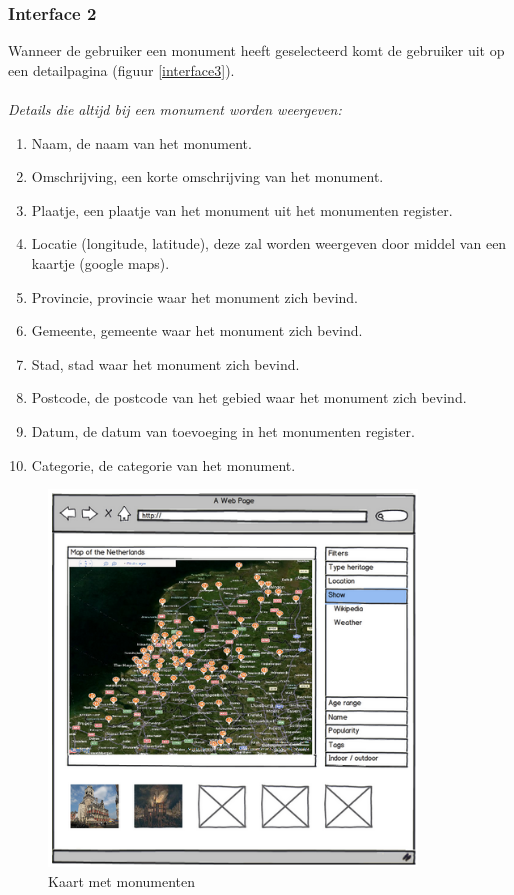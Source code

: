 \documentclass[a4paper,10pt]{article}
\begin{document}
			\subsubsection{Interface 2}
			Wanneer de gebruiker een monument heeft geselecteerd komt de gebruiker uit op een detailpagina (figuur \ref{interface3}).\\
			\\
			\textit{Details die altijd bij een monument worden weergeven:}
			\begin{enumerate}
				\item Naam, de naam van het monument.
				\item Omschrijving, een korte omschrijving van het monument.
				\item Plaatje, een plaatje van het monument uit het monumenten register.
				\item Locatie (longitude, latitude), deze zal worden weergeven door middel van een kaartje (google maps).
				\item Provincie, provincie waar het monument zich bevind.
				\item Gemeente, gemeente waar het monument zich bevind.
				\item Stad, stad waar het monument zich bevind.
				\item Postcode, de postcode van het gebied waar het monument zich bevind.
				\item Datum, de datum van toevoeging in het monumenten register.
				\item Categorie, de categorie van het monument.
			\end{enumerate}
			
			\begin{figure}[ht!]
				\centering
				\includegraphics[height=10cm]{interface1.png}
				\caption{Kaart met monumenten \label{interface1}}
			\end{figure}
			
\end{document}
